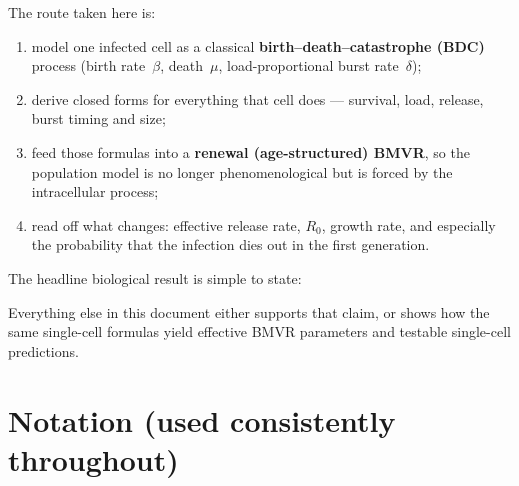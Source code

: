 \documentclass[11pt,a4paper]{article}
\theoremstyle{plain}
\theoremstyle{definition}
\theoremstyle{remark}
\begin{document}
The route taken here is:
\begin{enumerate}
\item model one infected cell as a classical \textbf{birth--death--catastrophe
(BDC)} process (birth rate~$\beta$, death~$\mu$, load-proportional burst
rate~$\delta$);
\item derive closed forms for everything that cell does --- survival, load,
release, burst timing and size;
\item feed those formulas into a \textbf{renewal (age-structured) BMVR}, so the
population model is no longer phenomenological but is forced by the
intracellular process;
\item read off what changes: effective release rate, $R_0$, growth rate, and
especially the probability that the infection dies out in the first generation.
\end{enumerate}

The headline biological result is simple to state:
\begin{center}
\end{center}

Everything else in this document either supports that claim, or shows how the
same single-cell formulas yield effective BMVR parameters and testable
single-cell predictions.

\section{Notation (used consistently throughout)}
\end{document}
